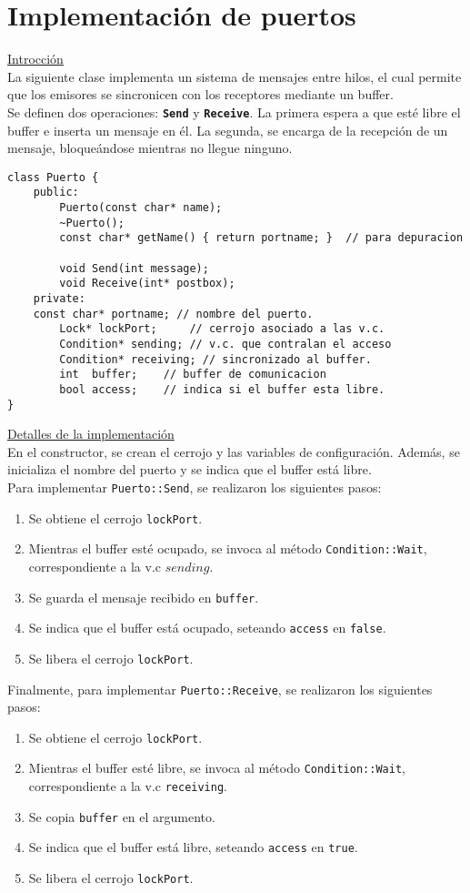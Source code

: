 \section{Implementación de puertos}
\textsf{\underline{Introcción}}\\
La siguiente clase implementa un sistema de mensajes entre hilos, el cual permite que los emisores se
sincronicen con los receptores mediante un buffer.\\
Se definen dos operaciones: \textbf{\texttt{Send}} y \textbf{\texttt{Receive}}. La primera espera a que esté libre el buffer e inserta un mensaje en él. La segunda, se encarga de la recepción de un mensaje, bloqueándose mientras no llegue ninguno.
\begin{lstlisting}[style=C]
class Puerto {
    public:
        Puerto(const char* name);
        ~Puerto();
        const char* getName() { return portname; }	// para depuracion

        void Send(int message);
        void Receive(int* postbox);
    private:
	const char* portname; // nombre del puerto.
        Lock* lockPort; 	// cerrojo asociado a las v.c.
        Condition* sending; // v.c. que contralan el acceso
        Condition* receiving; // sincronizado al buffer.
        int  buffer; 	// buffer de comunicacion
        bool access;	// indica si el buffer esta libre.
}
\end{lstlisting}
\textsf{\underline{Detalles de la implementación}}\\
En el constructor, se crean el cerrojo y las variables de configuración. Además, se inicializa el nombre del puerto y se indica que el buffer está libre.\\
Para implementar \texttt{Puerto::Send}, se realizaron los siguientes pasos:
\begin{enumerate}
	\item Se obtiene el cerrojo \texttt{lockPort}.
	\item Mientras el buffer esté ocupado, se invoca al método \texttt{Condition::Wait}, correspondiente a la v.c $sending$.
	\item Se guarda el mensaje recibido en \texttt{buffer}.
	\item Se indica que el buffer está ocupado, seteando \texttt{access} en \texttt{false}.
	\item Se libera el cerrojo \texttt{lockPort}.
\end{enumerate}
Finalmente, para implementar \texttt{Puerto::Receive}, se realizaron los siguientes pasos:
\begin{enumerate}
	\item Se obtiene el cerrojo \texttt{lockPort}.
	\item Mientras el buffer esté libre, se invoca al método \texttt{Condition::Wait}, correspondiente a la v.c \texttt{receiving}.
	\item Se copia \texttt{buffer} en el argumento.
	\item Se indica que el buffer está libre, seteando \texttt{access} en \texttt{true}.
	\item Se libera el cerrojo \texttt{lockPort}.
\end{enumerate}

